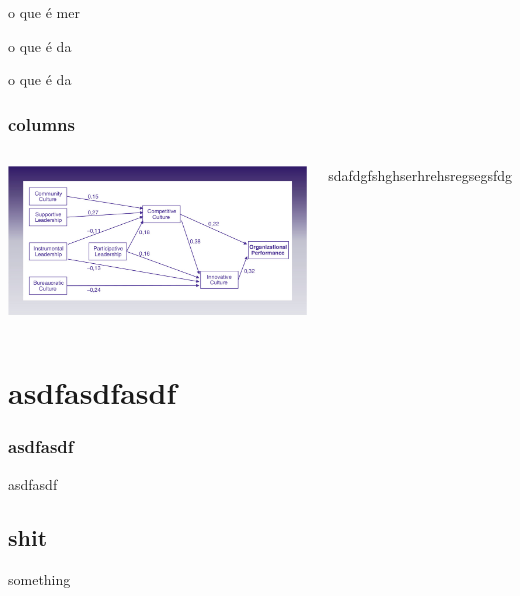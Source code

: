 \begin{frame}

\begin{block}{o que é}
mer
\end{block}
\begin{alertblock}{o que é}
da
\end{alertblock}
\begin{exampleblock}{o que é}
da
\end{exampleblock}

\end{frame}


\begin{frame}
\frametitle{columns}

\begin{columns}

\includegraphics[scale=.1]{"./image/OB/Ogbonna & Harris.jpg"}


sdafdgfshghserhrehsregsegsfdg

\end{columns}

\end{frame}



\section{asdfasdfasdf}

\begin{frame}
\frametitle{asdfasdf}

asdfasdf

\end{frame}

\subsection{shit}
something

